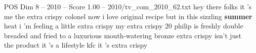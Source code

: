 \begin{textsample}{POS Dim 8 – 2010 – Score 1.00 – 2010/tv\_com\_2010\_62.txt}  \label{ex:f8_pos_058}
hey there folks it 's me the extra crispy colonel now i love original recipe but in this sizzling \textbf{summer} heat i 'm feeling a little extra crispy my extra crispy 20 philip is freshly double breaded and fried to a luxurious mouth-watering bronze extra crispy isn't just the product it 's a lifestyle kfc it 's extra crispy

\end{textsample}
